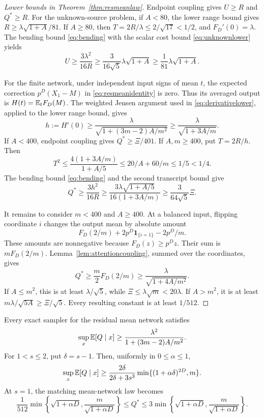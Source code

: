 \begin{proof}[Lower bounds in Theorem~\ref{thm:resmeanlaw}]
Endpoint coupling gives $U\ge R$ and $Q^*\ge R$.
For the unknown-source problem, if $A<80$, the lower range bound
gives $R\ge\lambda\sqrt{1+A}/81$.
If $A\ge80$, then $T=2R/\lambda\le2/\sqrt{17}<1/2$, and
$F_D'(0)=\lambda$. The bending bound \eqref{eq:bending} with the
scalar cost bound \eqref{eq:unknownlower} yields
\[
U\ge\frac{3\lambda^2}{16R}
\ge\frac3{16\sqrt5}\lambda\sqrt{1+A}
\ge\frac1{81}\lambda\sqrt{1+A}.
\]

For the finite network, under independent input signs of mean $t$,
the expected correction $p^D(X_1-M)$ in
\eqref{eq:resmeanidentity} is zero. Thus its averaged output is
$H(t)=\mathbb E_tF_D(M)$.
The weighted Jensen argument used in
\eqref{eq:derivativelower}, applied to the lower range bound, gives
\begin{equation}\label{eq:resfinitehprime}
h:=H'(0)\ge\frac\lambda{\sqrt{1+(3m-2)A/m^2}}
\ge\frac\lambda{\sqrt{1+3A/m}}.
\end{equation}
If $A<400$, endpoint coupling gives $Q^*\ge\Xi/401$.
If $A,m\ge400$, put $T=2R/h$. Then
\[
T^2\le\frac{4(1+3A/m)}{1+A/5}
\le20/A+60/m\le1/5<1/4.
\]
The bending bound \eqref{eq:bending} and the second transcript
bound give
\[
Q^*\ge\frac{3h^2}{16R}
\ge\frac{3\lambda\sqrt{1+A/5}}{16(1+3A/m)}
\ge\frac3{64\sqrt5}\Xi.
\]

It remains to consider $m<400$ and $A\ge400$.
At a balanced input, flipping coordinate $i$ changes the output
mean by absolute amount
\[
F_D(2/m)+2p^D\mathbf1_{\{i=1\}}-2p^D/m.
\]
These amounts are nonnegative because $F_D(z)\ge p^Dz$.
Their sum is $mF_D(2/m)$.
Lemma~\ref{lem:attentioncoupling}, summed over the coordinates, gives
\[
Q^*\ge\frac m2F_D(2/m)
\ge\frac\lambda{\sqrt{1+4A/m^2}}.
\]
If $A\le m^2$, this is at least $\lambda/\sqrt5$, while
$\Xi\le\lambda\sqrt m<20\lambda$.
If $A>m^2$, it is at least
$m\lambda/\sqrt{5A}\ge\Xi/\sqrt5$.
Every resulting constant is at least $1/512$.
\end{proof}

\begin{corollary}
\label{cor:reslower}
Every exact sampler for the residual mean network satisfies
\begin{equation}\label{eq:resfisherlower}
\sup_x\mathbb E[Q\mid x]\ge
\frac{\lambda^2}{1+(3m-2)A/m^2}.
\end{equation}
For $1<s\le2$, put $\delta=s-1$. Then, uniformly in
$0\le\alpha\le1$,
\begin{equation}\label{eq:ressuperlower}
\sup_x\mathbb E[Q\mid x]\ge
\frac{2\delta}{2\delta+3s^3}
\min\{(1+\alpha\delta)^{2D},m\}.
\end{equation}
At $s=1$, the matching mean-network law becomes
\begin{equation}\label{eq:rescriticalmean}
\frac1{512}\min\!\left\{\sqrt{1+\alpha D},
                   \frac m{\sqrt{1+\alpha D}}\right\}
\le Q^*\le
3\min\!\left\{\sqrt{1+\alpha D},
                   \frac m{\sqrt{1+\alpha D}}\right\}.
\end{equation}
\end{corollary}

